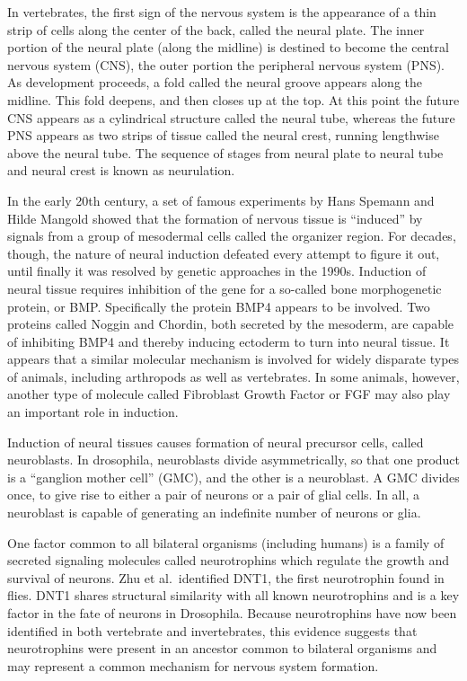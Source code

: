 \documentclass[]{book}
\begin{document}
In vertebrates, the first sign of the nervous system is the appearance of a thin strip of cells along the center of the back, called the neural plate. The inner portion of the neural plate (along the midline) is destined to become the central nervous system (CNS), the outer portion the peripheral nervous system (PNS). As development proceeds, a fold called the neural groove appears along the midline. This fold deepens, and then closes up at the top. At this point the future CNS appears as a cylindrical structure called the neural tube, whereas the future PNS appears as two strips of tissue called the neural crest, running lengthwise above the neural tube. The sequence of stages from neural plate to neural tube and neural crest is known as neurulation.

In the early 20th century, a set of famous experiments by Hans Spemann and Hilde Mangold showed that the formation of nervous tissue is ``induced'' by signals from a group of mesodermal cells called the organizer region. For decades, though, the nature of neural induction defeated every attempt to figure it out, until finally it was resolved by genetic approaches in the 1990s. Induction of neural tissue requires inhibition of the gene for a so-called bone morphogenetic protein, or BMP. Specifically the protein BMP4 appears to be involved. Two proteins called Noggin and Chordin, both secreted by the mesoderm, are capable of inhibiting BMP4 and thereby inducing ectoderm to turn into neural tissue. It appears that a similar molecular mechanism is involved for widely disparate types of animals, including arthropods as well as vertebrates. In some animals, however, another type of molecule called Fibroblast Growth Factor or FGF may also play an important role in induction.

Induction of neural tissues causes formation of neural precursor cells, called neuroblasts. In drosophila, neuroblasts divide asymmetrically, so that one product is a ``ganglion mother cell'' (GMC), and the other is a neuroblast. A GMC divides once, to give rise to either a pair of neurons or a pair of glial cells. In all, a neuroblast is capable of generating an indefinite number of neurons or glia.

One factor common to all bilateral organisms (including humans) is a family of secreted signaling molecules called neurotrophins which regulate the growth and survival of neurons. Zhu et al.~identified DNT1, the first neurotrophin found in flies. DNT1 shares structural similarity with all known neurotrophins and is a key factor in the fate of neurons in Drosophila. Because neurotrophins have now been identified in both vertebrate and invertebrates, this evidence suggests that neurotrophins were present in an ancestor common to bilateral organisms and may represent a common mechanism for nervous system formation.
\end{document}
